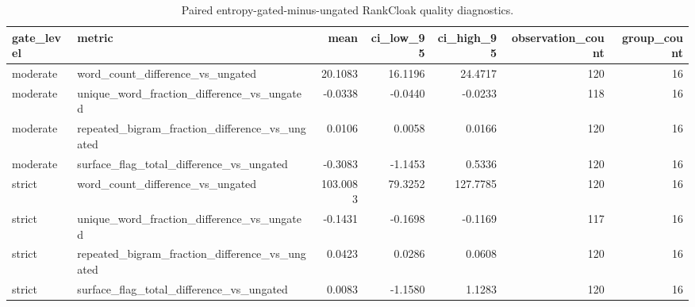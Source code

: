 \begin{table}
\caption{Paired entropy-gated-minus-ungated RankCloak quality diagnostics.}
\label{tab:entropy-gate-paired-changes}
\begin{tabular}{llrrrrr}
\toprule
gate\_level & metric & mean & ci\_low\_95 & ci\_high\_95 & observation\_count & group\_count \\
\midrule
moderate & word\_count\_difference\_vs\_ungated & 20.1083 & 16.1196 & 24.4717 & 120 & 16 \\
moderate & unique\_word\_fraction\_difference\_vs\_ungated & -0.0338 & -0.0440 & -0.0233 & 118 & 16 \\
moderate & repeated\_bigram\_fraction\_difference\_vs\_ungated & 0.0106 & 0.0058 & 0.0166 & 120 & 16 \\
moderate & surface\_flag\_total\_difference\_vs\_ungated & -0.3083 & -1.1453 & 0.5336 & 120 & 16 \\
strict & word\_count\_difference\_vs\_ungated & 103.0083 & 79.3252 & 127.7785 & 120 & 16 \\
strict & unique\_word\_fraction\_difference\_vs\_ungated & -0.1431 & -0.1698 & -0.1169 & 117 & 16 \\
strict & repeated\_bigram\_fraction\_difference\_vs\_ungated & 0.0423 & 0.0286 & 0.0608 & 120 & 16 \\
strict & surface\_flag\_total\_difference\_vs\_ungated & 0.0083 & -1.1580 & 1.1283 & 120 & 16 \\
\bottomrule
\end{tabular}
\end{table}
